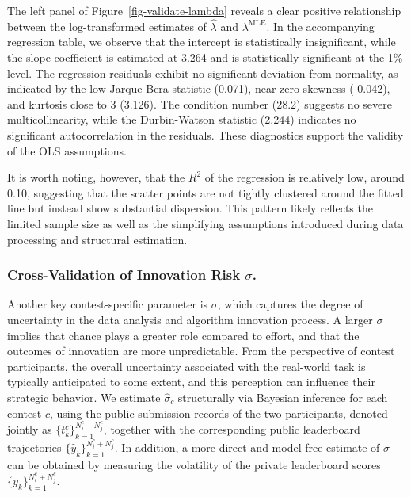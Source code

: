 \documentclass[mnsc]{informs3}
\begin{document}
The left panel of Figure~\ref{fig-validate-lambda} reveals a clear positive relationship between the log-transformed estimates of $\hat\lambda$ and $\lambda^{\text{MLE}}$.
In the accompanying regression table, we observe that the intercept is statistically insignificant, while the slope coefficient is estimated at 3.264 and is statistically significant at the 1\% level.
The regression residuals exhibit no significant deviation from normality, as indicated by the low Jarque-Bera statistic (0.071), near-zero skewness (-0.042), and kurtosis close to 3 (3.126). 
The condition number (28.2) suggests no severe multicollinearity, while the Durbin-Watson statistic (2.244) indicates no significant autocorrelation in the residuals. 
These diagnostics support the validity of the OLS assumptions.

It is worth noting, however, that the $R^2$ of the regression is relatively low, around 0.10, suggesting that the scatter points are not tightly clustered around the fitted line but instead show substantial dispersion.
This pattern likely reflects the limited sample size as well as the simplifying assumptions introduced during data processing and structural estimation.




\subsubsection{Cross-Validation of Innovation Risk $\sigma$.}

Another key contest-specific parameter is $\sigma$, which captures the degree of uncertainty in the data analysis and algorithm innovation process. 
A larger $\sigma$ implies that chance plays a greater role compared to effort, and that the outcomes of innovation are more unpredictable. 
From the perspective of contest participants, the overall uncertainty associated with the real-world task is typically anticipated to some extent, and this perception can influence their strategic behavior.
We estimate $\hat{\sigma}_c$ structurally via Bayesian inference for each contest $c$, using the public submission records of the two participants, denoted jointly as $\{t_k^c\}_{k=1}^{N^c_i + N^c_j}$, together with the corresponding public leaderboard trajectories $\{\hat{y}_{k}\}_{k=1}^{N^c_i + N^c_j}$. 
In addition, a more direct and model-free estimate of $\sigma$ can be obtained by measuring the volatility of the private leaderboard scores $\{y_k\}_{k=1}^{N^c_i+N^c_j}$.
\end{document}
